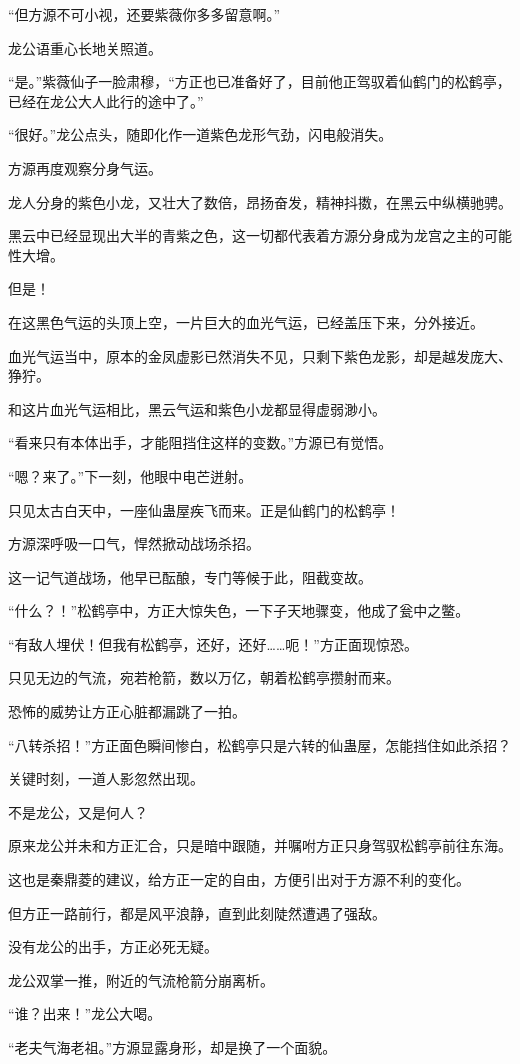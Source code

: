 \begin{this_body}
“但方源不可小视，还要紫薇你多多留意啊。”

龙公语重心长地关照道。

“是。”紫薇仙子一脸肃穆，“方正也已准备好了，目前他正驾驭着仙鹤门的松鹤亭，已经在龙公大人此行的途中了。”

“很好。”龙公点头，随即化作一道紫色龙形气劲，闪电般消失。

方源再度观察分身气运。

龙人分身的紫色小龙，又壮大了数倍，昂扬奋发，精神抖擞，在黑云中纵横驰骋。

黑云中已经显现出大半的青紫之色，这一切都代表着方源分身成为龙宫之主的可能性大增。

但是！

在这黑色气运的头顶上空，一片巨大的血光气运，已经盖压下来，分外接近。

血光气运当中，原本的金凤虚影已然消失不见，只剩下紫色龙影，却是越发庞大、狰狞。

和这片血光气运相比，黑云气运和紫色小龙都显得虚弱渺小。

“看来只有本体出手，才能阻挡住这样的变数。”方源已有觉悟。

“嗯？来了。”下一刻，他眼中电芒迸射。

只见太古白天中，一座仙蛊屋疾飞而来。正是仙鹤门的松鹤亭！

方源深呼吸一口气，悍然掀动战场杀招。

这一记气道战场，他早已酝酿，专门等候于此，阻截变故。

“什么？！”松鹤亭中，方正大惊失色，一下子天地骤变，他成了瓮中之鳖。

“有敌人埋伏！但我有松鹤亭，还好，还好……呃！”方正面现惊恐。

只见无边的气流，宛若枪箭，数以万亿，朝着松鹤亭攒射而来。

恐怖的威势让方正心脏都漏跳了一拍。

“八转杀招！”方正面色瞬间惨白，松鹤亭只是六转的仙蛊屋，怎能挡住如此杀招？

关键时刻，一道人影忽然出现。

不是龙公，又是何人？

原来龙公并未和方正汇合，只是暗中跟随，并嘱咐方正只身驾驭松鹤亭前往东海。

这也是秦鼎菱的建议，给方正一定的自由，方便引出对于方源不利的变化。

但方正一路前行，都是风平浪静，直到此刻陡然遭遇了强敌。

没有龙公的出手，方正必死无疑。

龙公双掌一推，附近的气流枪箭分崩离析。

“谁？出来！”龙公大喝。

“老夫气海老祖。”方源显露身形，却是换了一个面貌。

\end{this_body}


